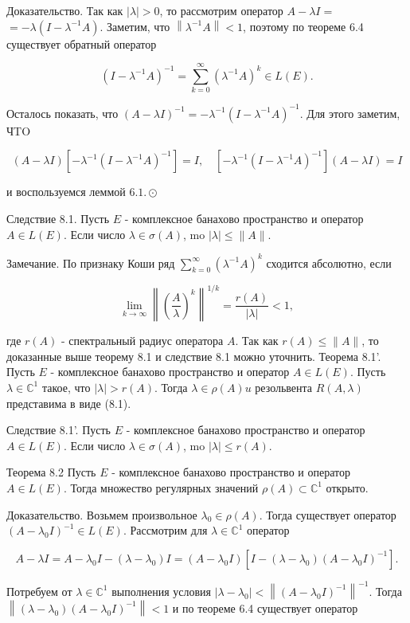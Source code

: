 Доказательство. Так как $|\lambda|>0$, то рассмотрим оператор $A-\lambda I=$ $=-\lambda\left(I-\lambda^{-1} A\right)$. Заметим, что $\left\|\lambda^{-1} A\right\|<1$, поэтому по теореме 6.4 существует обратный оператор

\[
\left(I-\lambda^{-1} A\right)^{-1}=\sum_{k=0}^{\infty}\left(\lambda^{-1} A\right)^{k} \in L(E) .
\]

Осталось показать, что $(A-\lambda I)^{-1}=-\lambda^{-1}\left(I-\lambda^{-1} A\right)^{-1}$. Для этого заметим, ЧTO

\[
(A-\lambda I)\left[-\lambda^{-1}\left(I-\lambda^{-1} A\right)^{-1}\right]=I, \quad\left[-\lambda^{-1}\left(I-\lambda^{-1} A\right)^{-1}\right](A-\lambda I)=I
\]

и воспользуемся леммой $6.1 . \odot$

Следствие 8.1. Пусть $E$ - комплексное банахово пространство и оператор $A \in L(E)$. Если число $\lambda \in \sigma(A)$, mo $|\lambda| \leq\|A\|$.

Замечание. По признаку Коши ряд $\sum_{k=0}^{\infty}\left(\lambda^{-1} A\right)^{k}$ сходится абсолютно, если

\[
\lim _{k \rightarrow \infty}\left\|\left(\frac{A}{\lambda}\right)^{k}\right\|^{1 / k}=\frac{r(A)}{|\lambda|}<1,
\]

где $r(A)$ - спектральный радиус оператора $A$. Так как $r(A) \leq\|A\|$, то доказанные выше теорему 8.1 и следствие 8.1 можно уточнить. Теорема 8.1'. Пусть $E$ - комплексное банахово пространство и оператор $A \in L(E)$. Пусть $\lambda \in \mathbb{C}^{1}$ такое, что $|\lambda|>r(A)$. Тогда $\lambda \in \rho(A) u$ резольвента $R(A, \lambda)$ представима в виде (8.1).

Следствие 8.1'. Пусть $E$ - комплексное банахово пространство и оператор $A \in L(E)$. Если число $\lambda \in \sigma(A)$, mo $|\lambda| \leq r(A)$.

Теорема 8.2 Пусть $E$ - комплексное банахово пространство и оператор $A \in L(E)$. Тогда множество регулярных значений $\rho(A) \subset \mathbb{C}^{1}$ открыто.

Доказательство. Возьмем произвольное $\lambda_{0} \in \rho(A)$. Тогда существует оператор $\left(A-\lambda_{0} I\right)^{-1} \in L(E)$. Рассмотрим для $\lambda \in \mathbb{C}^{1}$ оператор

\[
A-\lambda I=A-\lambda_{0} I-\left(\lambda-\lambda_{0}\right) I=\left(A-\lambda_{0} I\right)\left[I-\left(\lambda-\lambda_{0}\right)\left(A-\lambda_{0} I\right)^{-1}\right] .
\]

Потребуем от $\lambda \in \mathbb{C}^{1}$ выполнения условия $\left|\lambda-\lambda_{0}\right|<\left\|\left(A-\lambda_{0} I\right)^{-1}\right\|^{-1}$. Тогда $\left\|\left(\lambda-\lambda_{0}\right)\left(A-\lambda_{0} I\right)^{-1}\right\|<1$ и по теореме 6.4 существует оператор

